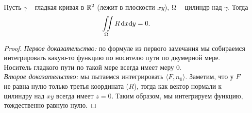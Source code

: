 \begin{remark}
    Пусть $\gamma$ -- гладкая кривая в $\mathbb{R}^2$ (лежит в плоскости $xy$), $\Omega$ -- цилиндр над $\gamma$. Тогда
\[
    \iint\limits_{\Omega}{R \,\mathrm{d} x \mathrm{d} y} = 0
.\] 
\end{remark}
\begin{proof}
    \enewline

    \textit{Первое доказательство:} по формуле из первого замечания мы собираемся интегрировать
    какую-то функцию по носителю пути по двумерной мере. Носитель гладкого пути по такой мере
    всегда имеет меру 0. \\
    \textit{Второе доказательство:} мы пытаемся интегрировать $\langle F, n_0 \rangle$.
    Заметим, что у $F$ не равна нулю только третья координата ($R$), тогда как
    вектор нормали к цилиндру над $xy$ всегда имеет $z = 0$. Таким
    образом, мы интегрируем функцию, тождественно равную нулю.
\end{proof}

